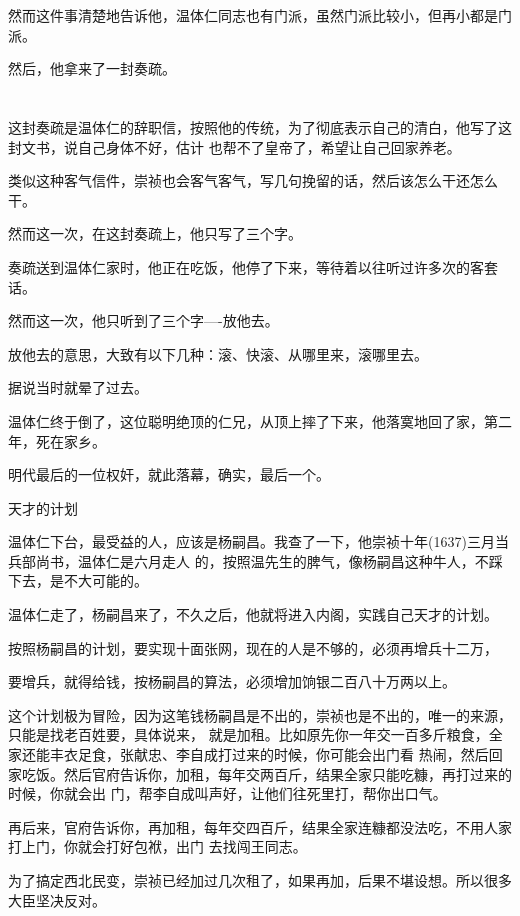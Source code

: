 \documentclass[11pt,a4paper,onecolumn]{article}
\begin{document}
然而这件事清楚地告诉他，温体仁同志也有门派，虽然门派比较小，但再小都是门派。

然后，他拿来了一封奏疏。

\section[\thesection]{}

这封奏疏是温体仁的辞职信，按照他的传统，为了彻底表示自己的清白，他写了这封文书，说自己身体不好，估计
也帮不了皇帝了，希望让自己回家养老。

类似这种客气信件，崇祯也会客气客气，写几句挽留的话，然后该怎么干还怎么干。

然而这一次，在这封奏疏上，他只写了三个字。

奏疏送到温体仁家时，他正在吃饭，他停了下来，等待着以往听过许多次的客套话。

然而这一次，他只听到了三个字----放他去。

放他去的意思，大致有以下几种：滚、快滚、从哪里来，滚哪里去。

据说当时就晕了过去。

温体仁终于倒了，这位聪明绝顶的仁兄，从顶上摔了下来，他落寞地回了家，第二年，死在家乡。

明代最后的一位权奸，就此落幕，确实，最后一个。

天才的计划

温体仁下台，最受益的人，应该是杨嗣昌。我查了一下，他崇祯十年(1637)三月当兵部尚书，温体仁是六月走人
的，按照温先生的脾气，像杨嗣昌这种牛人，不踩下去，是不大可能的。

温体仁走了，杨嗣昌来了，不久之后，他就将进入内阁，实践自己天才的计划。

按照杨嗣昌的计划，要实现十面张网，现在的人是不够的，必须再增兵十二万，

要增兵，就得给钱，按杨嗣昌的算法，必须增加饷银二百八十万两以上。

这个计划极为冒险，因为这笔钱杨嗣昌是不出的，崇祯也是不出的，唯一的来源，只能是找老百姓要，具体说来，
就是加租。比如原先你一年交一百多斤粮食，全家还能丰衣足食，张献忠、李自成打过来的时候，你可能会出门看
热闹，然后回家吃饭。然后官府告诉你，加租，每年交两百斤，结果全家只能吃糠，再打过来的时候，你就会出
门，帮李自成叫声好，让他们往死里打，帮你出口气。

再后来，官府告诉你，再加租，每年交四百斤，结果全家连糠都没法吃，不用人家打上门，你就会打好包袱，出门
去找闯王同志。

为了搞定西北民变，崇祯已经加过几次租了，如果再加，后果不堪设想。所以很多大臣坚决反对。
\end{document}
